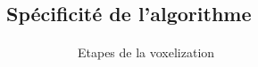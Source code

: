 \subsection{Spécificité de l'algorithme}

\begin{frame}[fragile=singleslide]{\insertsectionhead}
  \framesubtitle{\insertsubsectionhead}
  \begin{figure}[ht!]
    \begin{subfigure}{0.6\textwidth}
      \caption*{Etapes de la voxelization}
    \end{subfigure}
    \hfill
    \begin{subfigure}{0.2\textwidth}

\end{subfigure}
\end{figure}
\end{frame}
